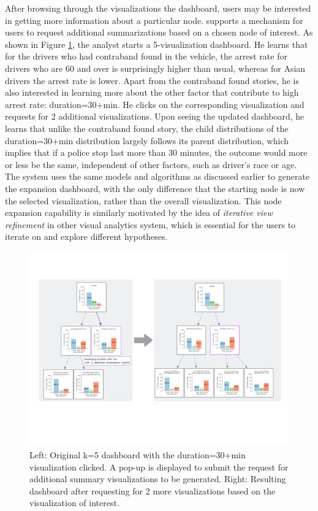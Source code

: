 \par After browsing through the visualizations the dashboard, users may be interested in getting more information about a particular node. \system supports a mechanism for users to request additional summarizations based on a chosen node of interest. As shown in Figure \ref{fig:altroot_expansion}, the analyst starts a 5-visualization dashboard. He learns that for the drivers who had contraband found in the vehicle, the arrest rate for drivers who are 60 and over is surprisingly higher than usual, whereas for Asian drivers the arrest rate is lower. Apart from the contraband found stories, he is also interested in learning more about the other factor that contribute to high arrest rate: duration=30+min. He clicks on the corresponding visualization and requests for 2 additional visualizations. Upon seeing the updated dashboard, he learns that unlike the contraband found story, the child distributions of the duration=30+min distribution largely follows its parent distribution, which implies that if a police stop last more than 30 minutes, the outcome would more or less be the same, independent of other factors, such as driver's race or age. The system uses the same models and algorithms as discussed earlier to generate the expansion dashboard, with the only difference that the starting node is now the selected visualization, rather than the overall visualization. This node expansion capability is similarly motivated by the idea of \textit{iterative view refinement} in other visual analytics system\cite{Wongsuphasawat2016,Hoque2017}, which is essential for the users to iterate on and explore different hypotheses. 
\begin{figure}[ht!]
\centering
\includegraphics[width=\linewidth]{figures/expansion_example.pdf}
\caption{Left: Original k=5 dashboard with the duration=30+min visualization clicked. A pop-up is displayed to submit the request for additional summary visualizations to be generated. Right: Resulting dashboard after requesting for 2 more visualizations based on the visualization of interest.}
\label{fig:altroot_expansion}
\end{figure}

